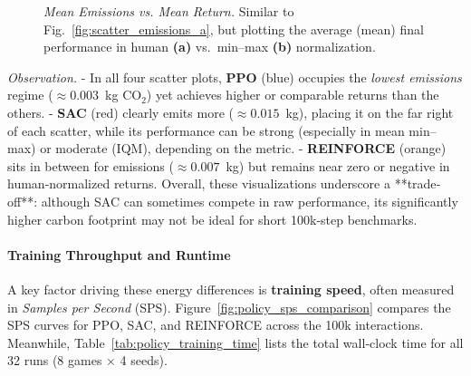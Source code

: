 \begin{figure} 
	\centering
	\quad
	\caption{\emph{Mean Emissions vs. Mean Return.}
		Similar to Fig.~\ref{fig:scatter_emissions_a}, but plotting the average (mean) final performance in human \textbf{(a)} vs.\ min--max \textbf{(b)} normalization.}
	\label{fig:scatter_emissions_b}
\end{figure}

\noindent
\emph{Observation.} 
- In all four scatter plots, \textbf{PPO} (blue) occupies the \emph{lowest emissions} regime (\(\approx 0.003\)~kg CO$_2$) yet achieves higher or comparable returns than the others. 
- \textbf{SAC} (red) clearly emits more (\(\approx 0.015\)~kg), placing it on the far right of each scatter, while its performance can be strong (especially in mean min–max) or moderate (IQM), depending on the metric. 
- \textbf{REINFORCE} (orange) sits in between for emissions (\(\approx 0.007\)~kg) but remains near zero or negative in human‐normalized returns. 
Overall, these visualizations underscore a **trade‐off**: although SAC can sometimes compete in raw performance, its significantly higher carbon footprint may not be ideal for short 100k‐step benchmarks.

\paragraph{Training Throughput and Runtime}
A key factor driving these energy differences is \textbf{training speed}, often measured in \emph{Samples per Second} (SPS). Figure~\ref{fig:policy_sps_comparison} compares the SPS curves for PPO, SAC, and REINFORCE across the 100k interactions. Meanwhile, Table~\ref{tab:policy_training_time} lists the total wall‐clock time for all 32 runs (8 games × 4 seeds).

